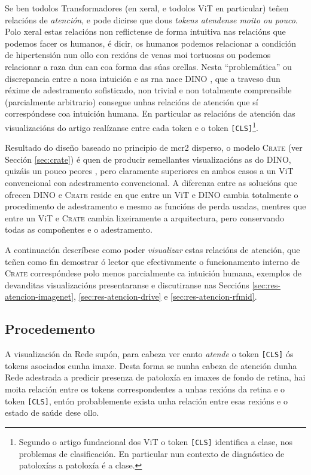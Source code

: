 Se ben todolos Transformadores (en xeral, e todolos ViT en particular) teñen relacións de \emph{atención}, e pode dicirse que dous \emph{\glspl{token} atendense moito ou pouco}. Polo xeral estas relacións non reflictense de forma intuitiva nas relacións que podemos facer os humanos, é dicir, os humanos podemos relacionar a condición de hipertensión nun ollo con rexións de venas moi tortuosas ou podemos relacionar a raza dun can coa forma das súas orellas. Nesta ``problemática'' ou discrepancia entre a nosa intuición e as \acrshort{rna} nace DINO \cite{dino}, que a traveso dun réxime de adestramento sofisticado, non trivial e non totalmente comprensible (parcialmente arbitrario) consegue unhas relacións de atención que sí correspóndese coa intuición humana. En particular as relacións de atención das visualizacións do artigo realízanse entre cada \gls{token} e o \gls{token} \texttt{[CLS]}\footnote{Segundo o artigo fundacional dos ViT \cite{vit} o \gls{token} \texttt{[CLS]} identifica a clase, nos problemas de clasificación. En particular nun contexto de diagnóstico de patoloxías a patoloxía é a clase.}.

Resultado do diseño baseado no principio de \acrshort{mcr2} disperso, o modelo \textsc{Crate} (ver Sección \ref{sec:crate}) é quen de producir semellantes visualizacións as do DINO, quizáis un pouco peores \cite{emergenciaSegmentacion}, pero claramente superiores en ambos casos a un ViT convencional con adestramento convencional. A diferenza entre as solucións que ofrecen DINO e \textsc{Crate} reside en que entre un ViT e DINO cambia totalmente o procedimento de adestramento e mesmo as funcións de perda usadas, mentres que entre un ViT e \textsc{Crate} cambia lixeiramente a arquitectura, pero conservando todas as compoñentes e o adestramento.

A continuación descríbese como poder \emph{visualizar} estas relacións de atención, que teñen como fin demostrar ó lector que efectivamente o funcionamento interno de \textsc{Crate} correspóndese polo menos parcialmente ca intuición humana, exemplos de devanditas visualizacións presentaranse e discutiranse nas Seccións \ref{sec:res-atencion-imagenet}, \ref{sec:res-atencion-drive} e \ref{sec:res-atencion-rfmid}.
\subsection{Procedemento}

A visualización da Rede supón, para cabeza ver canto \emph{atende} o \gls{token} \texttt{[CLS]} ós \glspl{token} asociados cunha imaxe. Desta forma se nunha cabeza de atención dunha Rede adestrada a predicir presenza de patoloxía en imaxes de fondo de retina, hai moita relación entre os \glspl{token} correspondentes a unhas rexións da retina e o \gls{token} \texttt{[CLS]}, entón probablemente exista unha relación entre esas rexións e o estado de saúde dese ollo.

